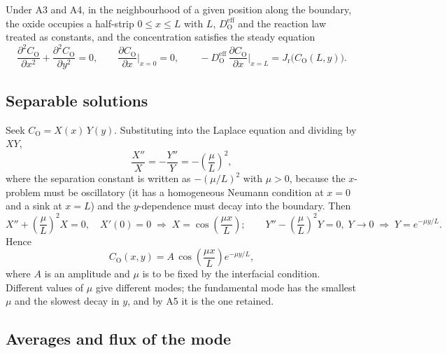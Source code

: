 \documentclass[12pt]{article}
\newcommand{\eff}{\mathrm{eff}}
\newcommand{\Ox}{\mathrm{O}}
\newcommand{\D}{D_{\Ox}^{\eff}}
\newcommand{\Jr}{J_{\mathrm{r}}}
\begin{document}
Under A3 and A4, in the neighbourhood of a given position along the boundary, the
oxide occupies a half-strip $0\le x\le L$ with $L$, $\D$ and the reaction law treated
as constants, and the concentration satisfies the steady equation
\begin{equation}
\frac{\partial^2 C_{\Ox}}{\partial x^2}+\frac{\partial^2 C_{\Ox}}{\partial y^2}=0,
\qquad
\frac{\partial C_{\Ox}}{\partial x}\bigg|_{x=0}=0,
\qquad
-\D\,\frac{\partial C_{\Ox}}{\partial x}\bigg|_{x=L}=\Jr\bigl(C_{\Ox}(L,y)\bigr).
\label{eq:laplace}
\end{equation}

\subsection{Separable solutions}

Seek $C_{\Ox}=X(x)\,Y(y)$. Substituting into the Laplace equation and dividing by
$XY$,
\begin{equation}
\frac{X''}{X}=-\frac{Y''}{Y}=-\left(\frac{\mu}{L}\right)^2,
\end{equation}
where the separation constant is written as $-(\mu/L)^2$ with $\mu>0$, because the
$x$-problem must be oscillatory (it has a homogeneous Neumann condition at $x=0$ and a
sink at $x=L$) and the $y$-dependence must decay into the boundary. Then
\begin{equation}
X''+\left(\frac{\mu}{L}\right)^2X=0,\quad X'(0)=0
\;\Rightarrow\;
X=\cos\!\left(\frac{\mu x}{L}\right);
\qquad
Y''-\left(\frac{\mu}{L}\right)^2Y=0,\;Y\to0
\;\Rightarrow\;
Y=e^{-\mu y/L}.
\end{equation}
Hence
\begin{equation}
C_{\Ox}(x,y)=A\,\cos\!\left(\frac{\mu x}{L}\right)e^{-\mu y/L},
\label{eq:mode}
\end{equation}
where $A$ is an amplitude and $\mu$ is to be fixed by the interfacial condition.
Different values of $\mu$ give different modes; the fundamental mode has the smallest
$\mu$ and the slowest decay in $y$, and by A5 it is the one retained.

\subsection{Averages and flux of the mode}
\end{document}
